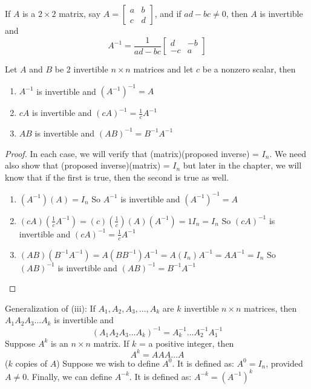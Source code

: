 \documentclass[12pt]{article}
\begin{document}
If $A$ is a $2 \times 2$ matrix, say $ A = \begin{bmatrix} a & b \\ c & d \end{bmatrix} $, and if $ad - bc \neq 0$, then $A$ is invertible and $$A^{-1} = \frac{1}{ad - bc} \begin{bmatrix} d & -b \\ -c & a \end{bmatrix} $$ 
\begin{theorem} Let $A$ and $B$ be 2 invertible $n \times n$ matrices and let $c$ be a nonzero scalar, then \begin{enumerate} 
\item $A^{-1}$ is invertible and $(A^{-1})^{-1} = A$ 
\item $cA$ is invertible and $(cA)^{-1} = \frac{1}{c}A^{-1} $ 
\item $AB$ is invertible and $(AB)^{-1} = B^{-1}A^{-1} $ \end{enumerate} \end{theorem}
\begin{proof} In each case, we will verify that (matrix)(proposed inverse) = $I_n$. We need also show that (proposed inverse)(matrix) = $I_n$ but later in the chapter, we will know that if the first is true, then the second is true as well. 
\begin{enumerate} 
\item $(A^{-1})(A) = I_n$ So $A^{-1}$ is invertible and $(A^{-1})^{-1} = A$ 
\item $ (cA)(\frac{1}{c}A^{-1}) = (c)(\frac{1}{c})(A)(A^{-1}) = 1I_n = I_n$ So $(cA)^{-1}$ is invertible and $(cA)^{-1} = \frac{1}{c}A^{-1} $ 
\item $(AB)(B^{-1}A^{-1}) = A(BB^{-1})A^{-1} = A(I_n)A^{-1} = AA^{-1} = I_n$ So $(AB)^{-1}$ is invertible and $(AB)^{-1} = B^{-1}A^{-1} $ \end{enumerate} \end{proof} 
Generalization of (iii): If $A_1, A_2, A_3, \dots, A_k$ are $k$ invertible $n \times n$ matrices, then $A_1A_2A_3\dots A_k$ is invertible and $$ (A_1A_2A_3\dots A_k)^{-1} = A_k^{-1}\dots A_2^{-1}A_1^{-1} $$
Suppose $A^k$ is an $n \times n$ matrix. If $k$ = a positive integer, then $$A^k = AAA\dots A$$ ($k$ copies of $A$) \newline
Suppose we wish to define $A^0$. It is defined as: $A^0 = I_n$, provided $A \neq 0$. \newline
Finally, we can define $A^{-k}$. It is defined as: $A^{-k} = (A^{-1})^k$ \newline
\end{document}
